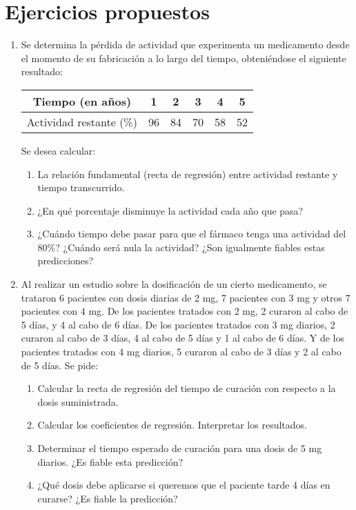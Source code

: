 \section{Ejercicios propuestos}
\begin{enumerate}[leftmargin=*]
\item  Se determina la pérdida de actividad que experimenta un medicamento desde el momento de su fabricación a lo
largo del tiempo, obteniéndose el siguiente resultado:
\begin{center}
\begin{tabular}{|c|c|c|c|c|c|}
\hline 
Tiempo (en años) & 1 & 2 & 3 & 4 & 5 \\ 
\hline 
Actividad restante (\%) & 96 & 84 & 70 & 58 & 52 \\ 
\hline
\end{tabular}
\end{center}
Se desea calcular:
\begin{enumerate}
\item  La relación fundamental (recta de regresión) entre actividad restante y tiempo transcurrido.
\item ¿En qué porcentaje disminuye la actividad cada año que pasa?
\item ¿Cuándo tiempo debe pasar para que el fármaco tenga una actividad del 80\%? ¿Cuándo será nula la actividad?
¿Son igualmente fiables estas predicciones?
\end{enumerate}

\item Al realizar un estudio sobre la dosificación de un cierto medicamento, se trataron 6 pacientes con dosis diarias
de 2 mg, 7 pacientes con 3 mg y otros 7 pacientes con 4 mg. De los pacientes tratados con 2 mg, 2 curaron al cabo de 5
días, y 4 al cabo de 6 días. De los pacientes tratados con 3 mg diarios, 2 curaron al cabo de 3 días, 4 al cabo de 5
días y 1 al cabo de 6 días. Y de los pacientes tratados con 4 mg diarios, 5 curaron al cabo de 3 días y 2 al cabo de 5
días. Se pide: 
\begin{enumerate}
\item Calcular la recta de regresión del tiempo de curación con respecto a la dosis suministrada.
\item Calcular los coeficientes de regresión. Interpretar los resultados.
\item  Determinar el tiempo esperado de curación para una dosis de 5 mg diarios. ¿Es fiable esta predicción?
\item ¿Qué dosis debe aplicarse si queremos que el paciente tarde 4 días en curarse? ¿Es fiable la predicción?
\end{enumerate}

\end{enumerate}
